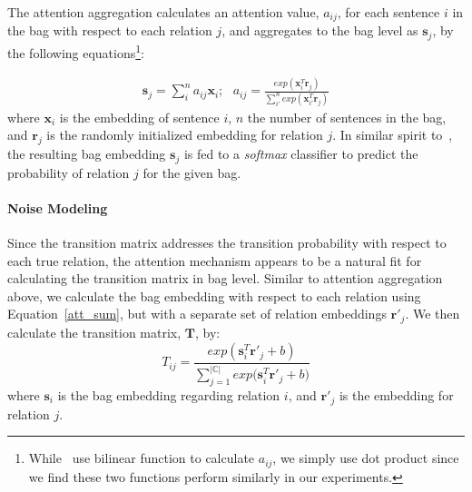 The attention aggregation calculates an attention value, $a_{ij}$, for each sentence $i$ in the bag with respect to each relation $j$, and aggregates to  the bag level as  $\mathbf{s}_j$, by the following equations\footnote{While~\cite{lin2016neural} use bilinear function to calculate $a_{ij}$, we simply use dot product since we find these two functions perform similarly in our experiments.}:

\begin{equation}
\begin{aligned}
\mathbf{s}_j = \sum_i^{n}{a_{ij} \mathbf{x}_{i}}; \mbox{       }a_{ij} = \frac{exp(\mathbf{x}_i^T \mathbf{r}_j)}{\sum_{i'}^n{exp(\mathbf{x}_{i'}^T \mathbf{r}_j)}}
\end{aligned}
\label{att_sum}
\end{equation}
%
where $\mathbf{x}_{i}$ is the embedding of sentence $i$, $n$ the number of sentences in the bag, and $\mathbf{r}_j$ is the randomly initialized embedding for relation $j$.
In similar spirit to~\cite{lin2016neural}, 
the resulting bag embedding $\mathbf{s}_j$ is fed to a \emph{softmax} classifier %
to predict the probability of relation $j$ for the given bag.

\paragraph{Noise Modeling}
Since the transition matrix addresses the transition probability with respect to each true relation, the attention mechanism appears to be a natural fit for calculating the transition matrix in bag level. 
Similar to attention aggregation above, 
we calculate the bag embedding with respect to each relation using Equation~\ref{att_sum},  but with a separate set of relation embeddings $\mathbf{r'}_j$.
We then calculate the transition matrix, $\mathbf{T}$, by:
\begin{equation}
T_{ij} = \frac{exp({\mathbf{s}_i^T \mathbf{r'}_j  + b})}{\sum_{j=1}^{|\mathbb{C}|}{exp(\mathbf{s}_i^T \mathbf{r'}_j + b})}
\end{equation}
where $\mathbf{s}_i$ is the bag embedding regarding relation $i$, and $\mathbf{r'}_j$ is the embedding for relation $j$.

